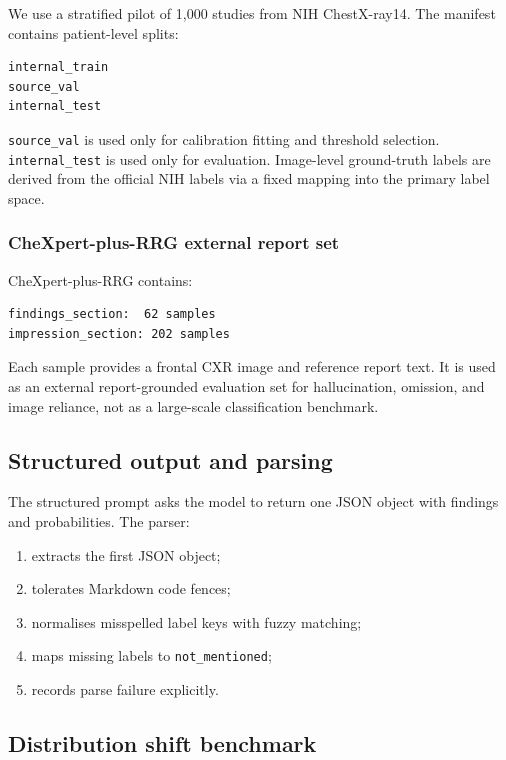 We use a stratified pilot of 1,000 studies from NIH ChestX-ray14. The manifest contains patient-level splits:

\begin{verbatim}
internal_train
source_val
internal_test
\end{verbatim}

\texttt{source\_val} is used only for calibration fitting and threshold selection. \texttt{internal\_test} is used only for evaluation. Image-level ground-truth labels are derived from the official NIH labels via a fixed mapping into the primary label space.

\subsubsection{CheXpert-plus-RRG external report set}

CheXpert-plus-RRG contains:

\begin{verbatim}
findings_section:  62 samples
impression_section: 202 samples
\end{verbatim}

Each sample provides a frontal CXR image and reference report text. It is used as an external report-grounded evaluation set for hallucination, omission, and image reliance, not as a large-scale classification benchmark.

\subsection{Structured output and parsing}

The structured prompt asks the model to return one JSON object with findings and probabilities. The parser:

\begin{enumerate}
\item extracts the first JSON object;
\item tolerates Markdown code fences;
\item normalises misspelled label keys with fuzzy matching;
\item maps missing labels to \texttt{not\_mentioned};
\item records parse failure explicitly.
\end{enumerate}

\subsection{Distribution shift benchmark}

